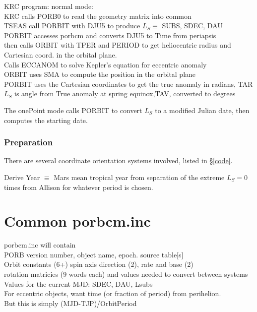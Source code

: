 \documentclass[draft]{article}
\newcommand{\qi}{\\ \hspace*{2.em}}      %
\newcommand{\qii}{\\ \hspace*{4.em}}     %
\newcommand{\qiii}{\\ \hspace*{6.em}}    %
\begin{document}
KRC program: normal mode:
\\ KRC calls PORB0 to read the geometry matrix into common
\\ TSEAS call PORBIT with DJU5 to produce $L_S \equiv $ SUBS, SDEC, DAU
\qi PORBIT accesses porbcm and converts DJU5 to Time from periapsis  
\qii then calls ORBIT with TPER and PERIOD to get heliocentric radius and Cartesian coord. in the orbital plane. 
\qiii Calls ECCANOM to solve Kepler's equation for eccentric anomaly
\qii  ORBIT uses SMA to compute the position in the orbital plane
\qi PORBIT uses the Cartesian coordinates to get the true anomaly in radians, TAR
\qii $L_S$ is angle from True anomaly at spring equinox,TAV, converted to degrees

The onePoint mode calls PORBIT to convert $L_S$ to a modified Julian date, then computes the starting date.

\subsubsection{Preparation }
There are several coordinate orientation systems involved, listed in \S \ref{code}. 

Derive Year $\equiv$ Mars mean tropical year from
separation of the extreme $L_S=0$ times from Allison for whatever period is
chosen.

\section{Common porbcm.inc}  %

porbcm.inc will contain
\qi PORB version number, object name, epoch. source table[s]
\qi Orbit constants (6+) spin axis direction (2), rate and base (2)
\qi rotation matricies (9 words each) and values needed to convert between systems
\qi Values for the current MJD: SDEC, DAU, Lsubs
\qi For eccentric objects, want time (or fraction of period) from perihelion.
\qii But this is simply (MJD-TJP)/OrbitPeriod
\end{document}
